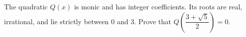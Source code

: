 The quadratic $Q(x)$ is monic and has integer coefficients. Its roots are real, irrational, and lie strictly between $0$ and $3$. Prove that $Q\left(\dfrac{3+\sqrt5}{2}\right)=0$.

